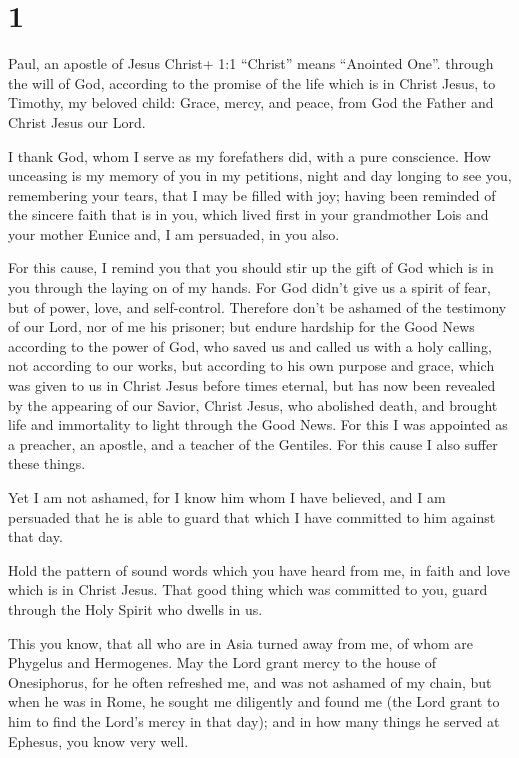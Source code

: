 \hypertarget{section}{%
\section{1}\label{section}}

 Paul, an apostle of Jesus Christ+ 1:1 ``Christ'' means
``Anointed One''. through the will of God, according to the promise of
the life which is in Christ Jesus,  to Timothy, my beloved
child: Grace, mercy, and peace, from God the Father and Christ Jesus our
Lord.

 I thank God, whom I serve as my forefathers did, with a
pure conscience. How unceasing is my memory of you in my petitions,
night and day  longing to see you, remembering your tears,
that I may be filled with joy;  having been reminded of the
sincere faith that is in you, which lived first in your grandmother Lois
and your mother Eunice and, I am persuaded, in you also.

 For this cause, I remind you that you should stir up the
gift of God which is in you through the laying on of my hands.
 For God didn't give us a spirit of fear, but of power,
love, and self-control.  Therefore don't be ashamed of the
testimony of our Lord, nor of me his prisoner; but endure hardship for
the Good News according to the power of God,  who saved us
and called us with a holy calling, not according to our works, but
according to his own purpose and grace, which was given to us in Christ
Jesus before times eternal,  but has now been revealed by
the appearing of our Savior, Christ Jesus, who abolished death, and
brought life and immortality to light through the Good News.
 For this I was appointed as a preacher, an apostle, and a
teacher of the Gentiles.  For this cause I also suffer
these things.

Yet I am not ashamed, for I know him whom I have believed, and I am
persuaded that he is able to guard that which I have committed to him
against that day.

 Hold the pattern of sound words which you have heard from
me, in faith and love which is in Christ Jesus.  That good
thing which was committed to you, guard through the Holy Spirit who
dwells in us.

 This you know, that all who are in Asia turned away from
me, of whom are Phygelus and Hermogenes.  May the Lord
grant mercy to the house of Onesiphorus, for he often refreshed me, and
was not ashamed of my chain,  but when he was in Rome, he
sought me diligently and found me  (the Lord grant to him
to find the Lord's mercy in that day); and in how many things he served
at Ephesus, you know very well.

